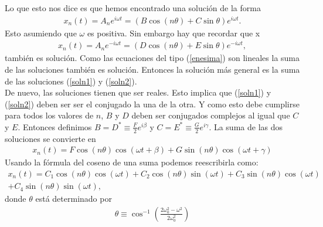 \documentclass[letterpaper,12pt,oneside]{book}
\begin{document}
%
Lo que esto nos dice es que hemos encontrado una soluci\'on de la forma
%
\begin{eqnarray}
x_n(t)=A_ne^{i\omega t} = (B\cos(n\theta)+C\sin\theta)e^{i\omega t}\label{soln1}.
\end{eqnarray}
%
Esto asumiendo que $\omega$ es positiva. Sin embargo hay que recordar que 
%
x\begin{eqnarray}
x_n(t)=A_ne^{-i\omega t} = (D\cos(n\theta)+E\sin\theta)e^{-i\omega t}\label{soln2},
\end{eqnarray}
%
tambi\'en es soluci\'on. Como las ecuaciones del tipo (\ref{enesima}) son lineales la suma de las soluciones tambi\'en es soluci\'on. Entonces la soluci\'on m\'as general es la suma de las soluciones (\ref{soln1}) y (\ref{soln2}). \\
De nuevo, las soluciones tienen que ser reales. Esto implica que (\ref{soln1}) y (\ref{soln2}) deben ser ser el conjugado la una de la otra. Y como esto debe cumplirse para todos los valores de $n$, $B$ y $D$ deben ser conjugados complejos al igual que $C$ y $E$. Entonces definimos $B=D^*\equiv \frac{F}{2}e^{i\beta}$ y $C=E^*\equiv \frac{G}{2}e^{i\gamma}$. La suma de las dos soluciones se convierte en
%
\begin{eqnarray}
x_n(t)=F\cos(n\theta)\cos(\omega t + \beta) + G\sin(n\theta) \cos(\omega t + \gamma)
\end{eqnarray}
%
Usando la f\'ormula del coseno de una suma podemos reescribirla como:
%
\begin{eqnarray}
x_n(t)=C_1 \cos(n\theta) \cos(\omega t) + C_2 \cos (n \theta)\sin(\omega t) + C_3 \sin(n\theta)\cos(\omega t) \nonumber
\\+ C_4 \sin(n\theta)\sin(\omega t),
\end{eqnarray}
%
donde $\theta$ est\'a determinado por
%
\begin{eqnarray}
\theta \equiv \cos ^{-1} \left(\frac{2\omega_0^2-\omega^2}{2 \omega_0^2}\right)
\end{eqnarray}
%
\end{document}
